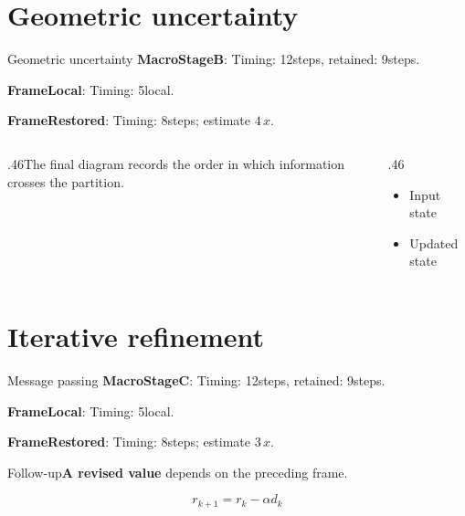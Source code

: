 \documentclass[12pt,aspectratio=169]{beamer}
\newcommand{\fuzzlayerA}[1]{\textbf{#1}}
\newcommand{\fuzzterm}[1]{\fuzzlayerA{#1}}
\newcommand{\fuzzpair}[2]{\fuzzterm{#1}: #2}
\newcommand{\fuzzunit}{steps}
\let\fuzzoriginalunit\fuzzunit
\newcommand{\fuzzcoefficient}{4}
\newcommand{\fuzzscale}[2][\fuzzcoefficient]{#1\,#2}
\begin{document}
\section{Geometric uncertainty}
\begin{frame}[t]{Geometric uncertainty}
\fuzzpair{MacroStageB}{Timing: 12\fuzzunit, retained: 9\fuzzoriginalunit.}\par
{\renewcommand{\fuzzunit}{local}\fuzzpair{FrameLocal}{Timing: 5\fuzzunit.}\par}
\fuzzpair{FrameRestored}{Timing: 8\fuzzunit; estimate $\fuzzscale{x}$.}\par
\begin{columns}[T]\begin{column}{.46\textwidth}The final diagram records the order in which information crosses the partition.\end{column}\begin{column}{.46\textwidth}\begin{itemize}\item Input state\item Updated state\end{itemize}\end{column}\end{columns}
\end{frame}
\renewcommand{\fuzzunit}{steps}
\renewcommand{\fuzzcoefficient}{3}
\renewcommand{\fuzzterm}[1]{{\textbf{#1}}}
\section{Iterative refinement}
\begin{frame}[t]{Message passing}
\fuzzpair{MacroStageC}{Timing: 12\fuzzunit, retained: 9\fuzzoriginalunit.}\par
{\renewcommand{\fuzzunit}{local}\fuzzpair{FrameLocal}{Timing: 5\fuzzunit.}\par}
\fuzzpair{FrameRestored}{Timing: 8\fuzzunit; estimate $\fuzzscale{x}$.}\par
\begin{block}{Follow-up}\fuzzterm{A revised value} depends on the preceding frame.\end{block}
\[r_{k+1}=r_k-\alpha d_k\]
\end{frame}
\renewcommand{\fuzzunit}{Hz}
\renewcommand{\fuzzcoefficient}{4}
\renewcommand{\fuzzterm}[1]{{\textit{#1}}}
\end{document}
